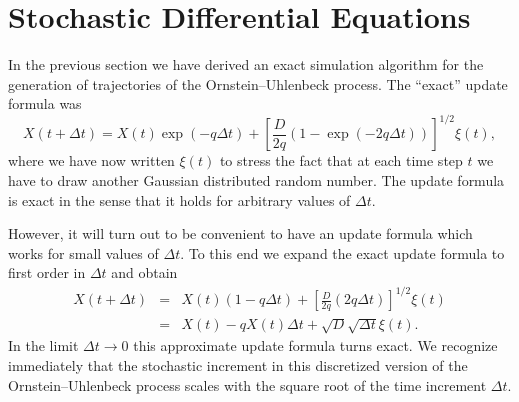 
\chapter{Stochastic Differential Equations}

In the previous section we have derived an exact simulation algorithm
for the generation of trajectories of the Ornstein--Uhlenbeck process.
The ``exact'' update formula was
\begin{equation*}
X(t+\Delta t) = X(t) \exp(-q \Delta t) +
  \left[ \frac{D}{2q}(1-\exp(-2q\Delta t)) \right]^{1/2} \xi(t),
\end{equation*}
where we have now written $\xi(t)$ to stress the fact that at each
time step $t$ we have to draw another Gaussian distributed random 
number. The update formula is exact in the sense that it holds for
arbitrary values of $\Delta t$.

However, it will turn out to be convenient to have an update formula
which works for small values of $\Delta t$. To this end we expand the
exact update formula to first order in $\Delta t$ and obtain
\begin{eqnarray}
X(t+\Delta t)& =& X(t) (1- q \Delta t) + 
   \left[ \frac{D}{2q} (2q \Delta t) \right]^{1/2} \xi(t) \nonumber
   \\
\label{SDE_APPROX} 
  & = & X(t) - qX(t) \Delta t + \sqrt{D} \sqrt{\Delta t} \xi(t).
\end{eqnarray}
In the limit $\Delta t \rightarrow 0$ this approximate update formula
turns exact.  We recognize immediately that the stochastic increment in
this discretized version of the Ornstein--Uhlenbeck process scales
with the square root of the time increment $\Delta t$.

